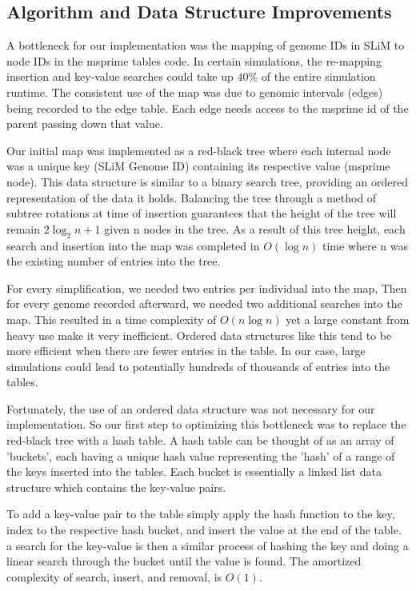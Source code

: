\documentclass{article}
\begin{document}
\subsection{Algorithm and Data Structure Improvements}

A bottleneck for our implementation was the mapping of genome IDs in SLiM to node IDs 
in the msprime tables code.
In certain simulations, the re-mapping insertion and key-value searches could take up $40\%$ of the entire simulation runtime. 
The consistent use of the map
was due to genomic intervals (edges) being recorded to the edge table.
Each edge needs access to the msprime id of the parent passing down that value.

Our initial map was implemented as a red-black tree where
each internal node was a unique key (SLiM Genome ID) containing its respective value (msprime node).
This data structure is similar to a binary search tree, providing an ordered representation of the data it holds. 
Balancing the tree through a method of subtree rotations at time of insertion guarantees that 
the height of the tree will remain $2\log_2{n+1}$ given n nodes in the tree.
As a result of this tree height, 
each search and insertion into the map was completed in $O(\log{}n)$ time where n 
was the existing number of entries into the tree. 

For every simplification, we needed two entries per individual into the map,
Then for every genome recorded afterward, 
we needed two additional searches into the map. 
This resulted in a time complexity of $O(n\log{}n)$ yet a large constant from heavy use make it very inefficient. 
Ordered data structures like this tend to be more efficient when there are
fewer entries in the table. 
In our case, large simulations could lead to potentially hundreds of thousands
of entries into the tables.

Fortunately, the use of an ordered data structure was not necessary for our implementation.
So our first step to optimizing this bottleneck was to replace the red-black tree with a hash table. 
A hash table can be thought of as an array of 'buckets', each having a unique hash value representing the 
'hash' of a range of the keys inserted into the tables. Each bucket is essentially a linked
list data structure which contains the key-value pairs. 

To add a key-value pair to the table simply apply the hash function to the key,
index to the respective hash bucket,
and insert the value at the end of the table. 
a search for the key-value is then a similar process of hashing the key and doing a linear search through the bucket until the value is found.
The amortized complexity of search, insert, and removal, is $O(1)$. 
\end{document}

